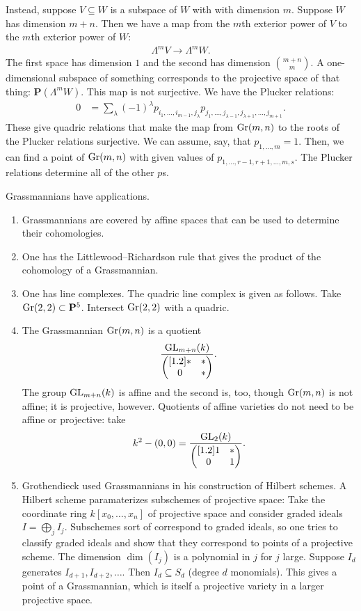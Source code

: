 \documentclass [11 pt, oneside, margin = 1 in] {article}
\begin{document}
Instead, suppose $V\subseteq W$ is a subspace of $W$ with with dimension $m$. Suppose $W$ has dimension $m+n$. Then we have a map from the $m$th exterior power of $V$ to the $m$th exterior power of $W$:
\begin{align*}
	\Lambda^m V \longrightarrow  \Lambda ^m W.
\end{align*}
The first space has dimension $1$ and the second has dimension $\binom{m+n}{m}$. A one-dimensional subspace of something corresponds to the projective space of that thing: $\mathbf{P}(\Lambda^m W)$. This map is not surjective. We have the Plucker relations:
\begin{align*}
	0 &= \sum_{\lambda}^{} (-1)^\lambda p_{i_1,\hdots, i_{m-1},j_\lambda} p_{j_1,\hdots, j_{\lambda -1},j_{\lambda+1},\hdots, j_{m+1}}.
\end{align*}
These give quadric relations that make the map from $\operatorname{Gr}(m,n)$ to the roots of the Plucker relations surjective. We can assume, say, that $p_{1,\hdots, m} = 1$. Then, we can find a point of $\operatorname{Gr}(m,n)$ with given values of $p_{1,\hdots, r-1,r+1,\hdots, m,s}$. The Plucker relations determine all of the other $p$s.

Grassmannians have applications.
\begin{enumerate}
	\item Grassmannians are covered by affine spaces that can be used to determine their cohomologies.
	\item One has the Littlewood--Richardson rule that gives the product of the cohomology of a Grassmannian.
	\item One has line complexes. The quadric line complex is given as follows. Take $\operatorname{Gr}(2,2)\subset  \mathbf{P}^5$. Intersect $\operatorname{Gr}(2,2)$ with a quadric.
	\item The Grassmannian $\operatorname{Gr}(m,n)$ is a quotient \[\frac{\operatorname{GL}_{m+n}(k)}{\begin{pmatrix} [ 1.2 ] *&*\\0&*\end{pmatrix}}.\] The group $\operatorname{GL}_{m+n}(k)$ is affine and the second is, too, though $\operatorname{Gr}(m,n)$ is not affine; it is projective, however. Quotients of affine varieties do not need to be affine or projective: take 
		\begin{align*}
			k^2 - (0,0) =  \frac{\operatorname{GL}_{2}(k) }{\begin{pmatrix} [ 1.2 ] 1&*\\0&1\end{pmatrix}}.
		\end{align*}
	\item Grothendieck used Grassmannians in his construction of Hilbert schemes. A Hilbert scheme paramaterizes subschemes of projective space: Take the coordinate ring $k[x_0,\hdots, x_n]$ of projective space and consider graded ideals $I = \bigoplus_j I_j$. Subschemes sort of correspond to graded ideals, so one tries to classify graded ideals and show that they correspond to points of a projective scheme. The dimension $\dim (I_j)$ is a polynomial in $j$ for $j$ large. Suppose $I_d$ generates $I_{d+1},I_{d+2},\hdots$. Then $I_d \subseteq S_d$ (degree $d$ monomials). This gives a point of a Grassmannian, which is itself a projective variety in a larger projective space.
\end{enumerate}
\end{document}
